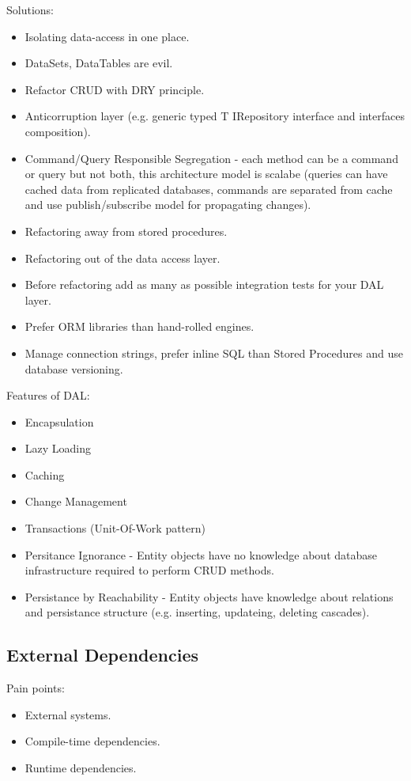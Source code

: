 \documentclass[11pt,a4paper]{article}
\begin{document}
Solutions:
\begin{itemize}
	\item Isolating data-access in one place.
	\item DataSets, DataTables are evil.
	\item Refactor CRUD with DRY principle.
	\item Anticorruption layer (e.g. generic typed T IRepository interface and interfaces composition).
	\item Command/Query Responsible Segregation - each method can be a command or query but not both, this architecture model is scalabe (queries can have cached data from replicated databases, commands are separated from cache and use publish/subscribe model for propagating changes).
	\item Refactoring away from stored procedures.
	\item Refactoring out of the data access layer.
	\item Before refactoring add as many as possible integration tests for your DAL layer.
	\item Prefer ORM libraries than hand-rolled engines.
	\item Manage connection strings, prefer inline SQL than Stored Procedures and use database versioning.
\end{itemize}

Features of DAL:
\begin{itemize}
	\item Encapsulation
	\item Lazy Loading
	\item Caching
	\item Change Management
	\item Transactions (Unit-Of-Work pattern)
	\item Persitance Ignorance - Entity objects have no knowledge about database infrastructure required to perform CRUD methods.
	\item Persistance by Reachability - Entity objects have knowledge about relations and persistance structure (e.g. inserting, updateing, deleting cascades).
\end{itemize}

\subsection{External Dependencies}

Pain points:
\begin{itemize}
	\item External systems.
	\item Compile-time dependencies.
	\item Runtime dependencies.
\end{itemize}
\end{document}

